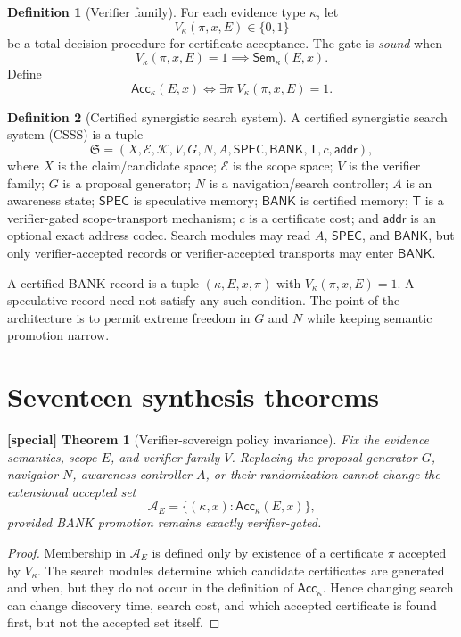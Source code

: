\documentclass[11pt]{article}
\theoremstyle{special}
\newtheorem{specialthm}{[special] Theorem}[section]
\theoremstyle{definition}
\newtheorem{definition}{Definition}[section]
\newcommand{\BANK}{\mathsf{BANK}}
\newcommand{\SPEC}{\mathsf{SPEC}}
\newcommand{\Acc}{\mathsf{Acc}}
\newcommand{\Sem}{\mathsf{Sem}}
\begin{document}
\begin{definition}[Verifier family]
For each evidence type $\kappa$, let
\[
V_\kappa(\pi,x,E)\in\{0,1\}
\]
be a total decision procedure for certificate acceptance. The gate is \emph{sound} when
\[
V_\kappa(\pi,x,E)=1\implies \Sem_\kappa(E,x).
\]
Define
\[
\Acc_\kappa(E,x)\iff \exists\pi\;V_\kappa(\pi,x,E)=1.
\]
\end{definition}

\begin{definition}[Certified synergistic search system]
A certified synergistic search system (CSSS) is a tuple
\[
\mathfrak S=(X,\mathcal E,\mathcal K,V,G,N,A,\SPEC,\BANK,\mathsf T,c,\mathsf{addr}),
\]
where $X$ is the claim/candidate space; $\mathcal E$ is the scope space; $V$ is the verifier family; $G$ is a proposal generator; $N$ is a navigation/search controller; $A$ is an awareness state; $\SPEC$ is speculative memory; $\BANK$ is certified memory; $\mathsf T$ is a verifier-gated scope-transport mechanism; $c$ is a certificate cost; and $\mathsf{addr}$ is an optional exact address codec. Search modules may read $A$, $\SPEC$, and $\BANK$, but only verifier-accepted records or verifier-accepted transports may enter $\BANK$.
\end{definition}

A certified BANK record is a tuple $(\kappa,E,x,\pi)$ with $V_\kappa(\pi,x,E)=1$. A speculative record need not satisfy any such condition. The point of the architecture is to permit extreme freedom in $G$ and $N$ while keeping semantic promotion narrow.

\section{Seventeen synthesis theorems}

\begin{specialthm}[Verifier-sovereign policy invariance]
Fix the evidence semantics, scope $E$, and verifier family $V$. Replacing the proposal generator $G$, navigator $N$, awareness controller $A$, or their randomization cannot change the extensional accepted set
\[
\mathcal A_E=\{(\kappa,x):\Acc_\kappa(E,x)\},
\]
provided BANK promotion remains exactly verifier-gated.
\end{specialthm}
\begin{proof}
Membership in $\mathcal A_E$ is defined only by existence of a certificate $\pi$ accepted by $V_\kappa$. The search modules determine which candidate certificates are generated and when, but they do not occur in the definition of $\Acc_\kappa$. Hence changing search can change discovery time, search cost, and which accepted certificate is found first, but not the accepted set itself.\qedhere
\end{proof}
\end{document}
